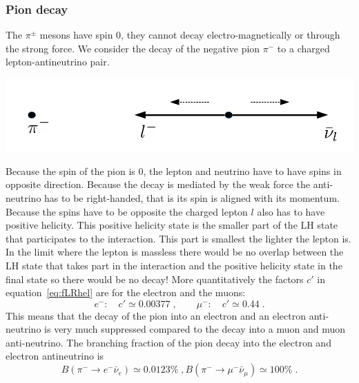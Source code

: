 \documentclass[12pt]{article}
\begin{document}
\subsubsection{Pion decay}
The $\pi^\pm$ mesons have spin 0, they cannot decay electro-magnetically or through the strong force. We consider the decay of the negative pion $\pi^-$ to a charged lepton-antineutrino pair.
\begin{center}
\includegraphics[scale=0.4]{images/PionDecay.png}
\end{center}
Because the spin of the pion is 0, the lepton and neutrino have to have spins in opposite direction. Because the decay is mediated by the weak force the anti-neutrino has to be right-handed, that is its spin is aligned with its momentum. Because the spins have to be opposite the charged lepton $l$ also has to have positive helicity. This positive helicity state is the smaller part of the LH state that participates to the interaction. This part is smallest the lighter the lepton is. In the limit where the lepton is massless there would be no overlap between the LH state that takes part in the interaction and the positive helicity state in the final state so there would be no decay! More quantitatively the factors $c'$ in equation~\ref{eq:fLRhel} are for the electron and the muons:
\[
e^-:\quad c'\simeq 0.00377 \;,
\qquad
\mu^-:\quad c'\simeq 0.44 \;.
\]
This means that the decay of the pion into an electron and an electron anti-neutrino is very much suppressed compared to the decay into a muon and muon anti-neutrino. 
The branching fraction of the pion decay into the electron and electron antineutrino is 
\[B(\pi^-\rightarrow e^-\bar \nu_e)\simeq0.0123\%\;,B(\pi^-\rightarrow \mu^-\bar \nu_\mu)\simeq 100\%\;.\]   
\end{document}
